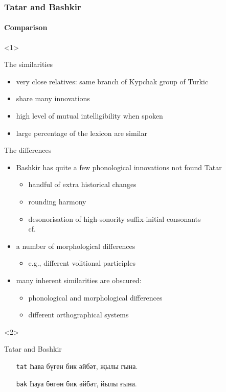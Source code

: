 \documentclass[10pt,xetex]{beamer} %
\newcommand{\compresslist}{
	\setlength{\itemsep}{1pt}
	\setlength{\parskip}{0pt}
	\setlength{\parsep}{0pt}
}
\begin{document}
\begin{frame}
	\frametitle{Tatar and Bashkir}
	\framesubtitle{Comparison}
 
  \begin{onlyenv}<1>
	 \begin{block}{The similarities}
	 	\begin{itemize}\compresslist
			\item very close relatives: same branch of Kypchak group of Turkic
			\item share many innovations
			\item high level of mutual intelligibility when spoken
			\item large percentage of the lexicon are similar
		\end{itemize}
	\end{block}

	\begin{block}{The differences}
		\begin{itemize}\compresslist
			\item Bashkir has quite a few phonological innovations not found Tatar
			\begin{itemize}
				\item handful of extra historical changes
				\item rounding harmony
				\item desonorisation of high-sonority suffix-initial consonants\\cf.\ \citet{washington10}
			\end{itemize}
			\item a number of morphological differences
			\begin{itemize}
				\item e.g., different volitional participles
			\end{itemize}
			\item many inherent similarities are obscured:
			\begin{itemize}
				\item phonological and morphological differences
				\item different orthographical systems
			\end{itemize}
		\end{itemize}
	\end{block}
  \end{onlyenv}
  \begin{onlyenv}<2>
  
	\begin{block}{Tatar and Bashkir}
		\begin{itemize}
			\item[{\small {\tt tat}}] Һава бүген бик әйбәт, җылы гына.  \\
			{}
			\item[{\small {\tt bak}}] Һауа бөгөн бик әйбәт, йылы ғына. \\
			{}
		\end{itemize}
	\end{block}


\end{onlyenv}
\end{frame}
\end{document}
